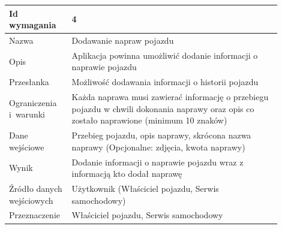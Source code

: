 \documentclass[12pt]{article}
\begin{document}
\begin{table}[H]
\begin{center}
	\begin{tabular}{|p{0.18\linewidth}|p{0.72\linewidth}|}%
	\hline
	Id wymagania 	& 4 				\\ \hline
	Nazwa			& Dodawanie napraw pojazdu \\ \hline
	Opis & Aplikacja powinna umożliwić dodanie informacji o naprawie pojazdu
\\ \hline
	Przesłanka & 
Możliwość dodawania informacji o historii pojazdu
  \\ \hline
	Ograniczenia i~warunki & 
Każda naprawa musi zawierać informację o przebiegu pojazdu w chwili dokonania naprawy oraz opis co zostało naprawione (minimum 10 znaków)
 \\ \hline
	Dane wejściowe &

Przebieg pojazdu, opis naprawy, skrócona nazwa naprawy
(Opcjonalne: zdjęcia, kwota naprawy)
 \\ \hline
	Wynik & Dodanie informacji o naprawie pojazdu wraz z informacją kto dodał naprawę\\ \hline
	Źródło danych wejściowych & Użytkownik (Właściciel pojazdu, Serwis samochodowy)\\ \hline
	Przeznaczenie & Właściciel pojazdu, Serwis samochodowy\\ \hline
	\end{tabular}

\end{center}
\end{table}
\end{document}
